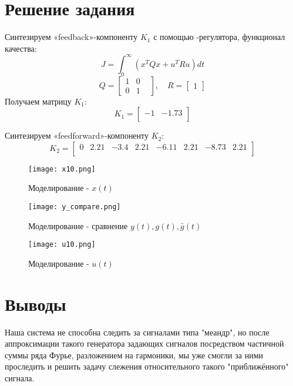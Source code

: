 \section{Решение задания}

Синтезируем «feedback»-компоненту $K_1$ с помощью -регулятора, функционал качества:
$$
  J = \int_0^{\infty} (x^TQx + u^TRu) dt
$$ 
$$
  Q = \begin{bmatrix}
    1 & 0 &  \\
    0 & 1 & 
  \end{bmatrix}, \quad R = \begin{bmatrix}
    1
  \end{bmatrix}
$$
Получаем матрицу $K_1$:
$$
  K_1 = \begin{bmatrix}
    -1 & -1.73 \\
\end{bmatrix}
$$

Синтезируем «feedforward»-компоненту $K_2$:
$$
  K_2 = \begin{bmatrix}
    0 & 2.21 & -3.4 & 2.21 & -6.11 & 2.21 & -8.73 & 2.21 \\
\end{bmatrix}
$$



\begin{figure}[ht]
  \centering
  \texttt{[image: x10.png]}
  \caption{Моделирование - $x(t)$}
\end{figure}

\begin{figure}[ht]
  \centering
  \texttt{[image: y\_compare.png]}
  \caption{Моделирование - сравнение $y(t), g(t), \bar{g}(t)$}
\end{figure}

\begin{figure}[ht]
  \centering
  \texttt{[image: u10.png]}
  \caption{Моделирование - $u(t)$}
\end{figure}

\section{Выводы}

Наша система не способна следить за сигналами типа "меандр", но после аппроксимации такого генератора задающих сигналов посредством частичной суммы ряда Фурье, разложением на гармоники, 
мы уже смогли за ними проследить и решить задачу слежения относительного такого "приближённого" сигнала.

\endinput